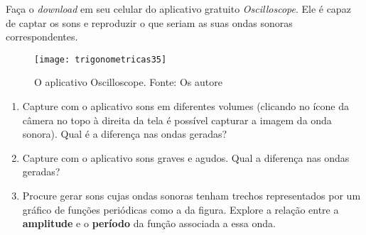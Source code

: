 \begin{knowledge}
Faça o \textit{download} em seu celular do aplicativo gratuito \textit{Oscilloscope}. Ele é capaz de captar os sons e reproduzir o que seriam as suas ondas sonoras correspondentes.

\begin{figure}[H]
\centering

\texttt{[image: trigonometricas35]}
\caption{O aplicativo Oscilloscope. Fonte: Os autore}

\end{figure}

\begin{enumerate}
\item Capture com o aplicativo sons em diferentes volumes (clicando no ícone da câmera no topo à direita da tela é possível capturar a imagem da onda sonora). Qual é a diferença nas ondas geradas?
\item Capture com o aplicativo sons graves e agudos. Qual a diferença nas ondas geradas?
\item Procure gerar sons cujas ondas sonoras tenham trechos representados por um gráfico de funções periódicas como a da figura. Explore a relação entre a \textbf{amplitude} e o \textbf{período} da função associada a essa onda.

\end{enumerate}

\end{knowledge}



